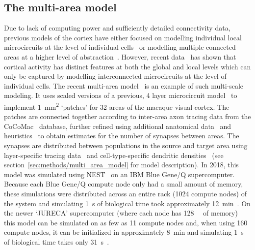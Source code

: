 \documentclass[9pt,a4paper]{amsart}
\begin{document}
\subsection{The multi-area model}
\label{sec:results/multi_area_model}
Due to lack of computing power and sufficiently detailed connectivity data, previous models of the cortex have either focused on modelling individual local microcircuits at the level of individual cells~\citep{Izhikevich2008,Potjans2012} or modelling multiple connected areas at a higher level of abstraction~\citep{Cabral2014}.
However, recent data~\citep{Belitski2008} has shown that cortical activity has distinct features at both the global and local levels which can only be captured by modelling interconnected microcircuits at the level of individual cells.
The recent multi-area model~\citep{Schmidt2018a,Schmidt2018} is an example of such multi-scale modeling.
It uses scaled versions of a previous, 4 layer microcircuit model~\citep{Potjans2012} to implement \SI{1}{\milli\meter\squared} `patches' for 32 areas of the macaque visual cortex.
The patches are connected together according to inter-area axon tracing data from the CoCoMac~\citep{Bakker2012} database, further refined using additional anatomical data~\citep{Markov2014} and heuristics~\citep{Ercsey-Ravasz2013} to obtain estimates for the number of synapses between areas.
The synapses are distributed between populations in the source and target area using layer-specific tracing data~\citep{Markov2014b} and cell-type-specific dendritic densities~\citep{Binzegger2004} (see section~\ref{sec:methods/multi_area_model} for model description).
In 2018, this model was simulated using NEST~\citep{Gewaltig2007} on an IBM Blue Gene/Q supercomputer.
Because each Blue Gene/Q compute node only had a small amount of memory, these simulations were distributed across an entire rack (\num{1024} compute nodes) of the system and simulating \SI{1}{\second} of biological time took approximately \SI{12}{\minute}~\citep{Schmidt2018}.
On the newer `JURECA' supercomputer (where each node has \SI{128}{\giga\byte} of memory) this model can be simulated on as few as \num{11} compute nodes and,
when using \num{160} compute nodes, it can be initialized in approximately \SI{8}{\minute} and simulating \SI{1}{\second} of biological time takes only \SI{31}{\second}~\citep{VanAlbada2020}.
\end{document}
